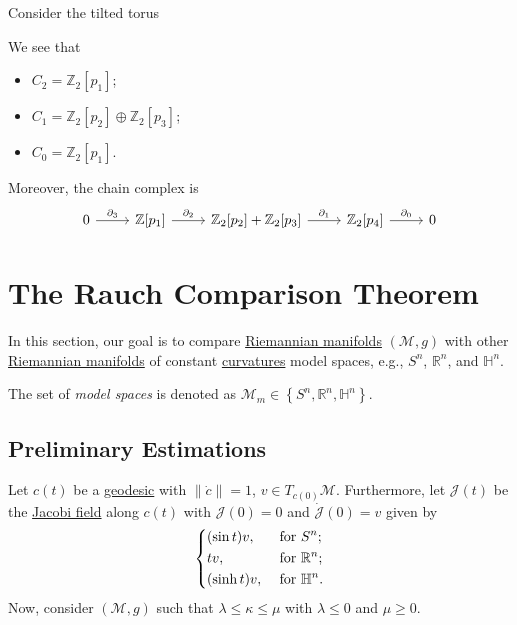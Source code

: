 \begin{eg}
	Consider the tilted torus
	\begin{center}
	\end{center}
	We see that
	\begin{itemize}
		\item \(C_2 = \mathbb{Z} _2 [p_1]\);
		\item \(C_1 = \mathbb{Z} _2[p_2] \oplus \mathbb{Z} _2[p_3]\);
		\item \(C_0 = \mathbb{Z} _2[p_1]\).
	\end{itemize}
	Moreover, the chain complex is
	\[\begin{tikzcd}
			0 & {\mathbb{Z}[p_1]} & {\mathbb{Z}_2[p_2]+\mathbb{Z}_2[p_3]} & {\mathbb{Z}_2[p_4]} & 0
			\arrow["{\partial_3}", from=1-1, to=1-2]
			\arrow["{\partial_2}", from=1-2, to=1-3]
			\arrow["{\partial_1}", from=1-3, to=1-4]
			\arrow["{\partial_0}", from=1-4, to=1-5]
		\end{tikzcd}\]
\end{eg}

\section{The Rauch Comparison Theorem}
In this section, our goal is to compare \hyperref[def:Riemannian-manifold]{Riemannian manifolds} \((\mathcal{M} , g)\) with other \hyperref[def:Riemannian-manifold]{Riemannian manifolds} of constant \hyperref[def:sectional-curvature]{curvatures} model spaces, e.g., \(S^n\), \(\mathbb{R} ^n\), and \(\mathbb{H} ^n\).

\begin{notation}
	The set of \emph{model spaces} is denoted as \(\mathcal{M} _m \in \left\{ S^n, \mathbb{R} ^n, \mathbb{H} ^n \right\} \).
\end{notation}

\subsection{Preliminary Estimations}
Let \(c(t)\) be a \hyperref[def:geodesic]{geodesic} with \(\lVert \dot{c} \rVert =1\), \(v\in T_{c(0)} \mathcal{M} \). Furthermore, let \(\mathcal{J} (t)\) be the \hyperref[def:Jacobi-field]{Jacobi field} along \(c(t)\) with \(\mathcal{J} (0) = 0\) and \(\dot{\mathcal{J} }(0) = v \) given by
\[
	\begin{dcases}
		(\sin t)v,  & \text{ for } S^n ;           \\
		tv,         & \text{ for } \mathbb{R} ^n ; \\
		(\sinh t)v, & \text{ for } \mathbb{H} ^n .
	\end{dcases}
\]
Now, consider \((\mathcal{M} , g)\) such that \(\lambda \leq \kappa \leq \mu \) with \(\lambda \leq 0\) and \(\mu \geq 0\).


